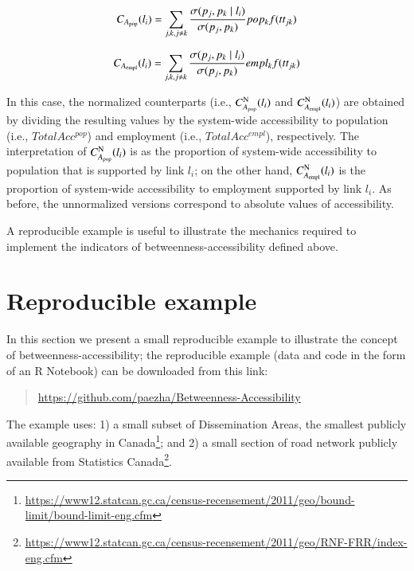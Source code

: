 \documentclass[]{elsarticle} %
\begin{document}
\begin{equation}\label{f:btw_acc_pop}
C_{A_{\rm pop}}(l_i)  =\sum_{j,k,j\neq k} \frac{{\sigma(p_j,p_k \mid l_i)}}{\sigma(p_j,p_k)} {{pop_k}{f(tt_{jk})}}%
\end{equation}

\begin{equation}\label{f:btw_empl_pop}
C_{A_{\rm empl}}(l_i)  =\sum_{j,k,j\neq k} \frac{{\sigma(p_j,p_k \mid l_i)}}{\sigma(p_j,p_k)} empl_kf(tt_{jk})%
\end{equation}

In this case, the normalized counterparts (i.e.,
\(C_{A_{\rm pop}}^{\rm N}(l_i)\) and \(C_{A_{\rm empl}}^{\rm N}(l_i)\))
are obtained by dividing the resulting values by the system-wide
accessibility to population (i.e., \(TotalAcc^{pop}\)) and employment
(i.e., \(TotalAcc^{empl}\)), respectively. The interpretation of
\(C_{A_{\rm pop}}^{\rm N}(l_i)\) is as the proportion of system-wide
accessibility to population that is supported by link \(l_i\); on the
other hand, \(C_{A_{\rm empl}}^{\rm N}(l_i)\) is the proportion of
system-wide accessibility to employment supported by link \(l_i\). As
before, the unnormalized versions correspond to absolute values of
accessibility.

A reproducible example is useful to illustrate the mechanics required to
implement the indicators of betweenness-accessibility defined above.

\section{Reproducible example}\label{reproducible-example}

In this section we present a small reproducible example to illustrate
the concept of betweenness-accessibility; the reproducible example (data
and code in the form of an R Notebook) can be downloaded from this link:

\begin{quote}
\url{https://github.com/paezha/Betweenness-Accessibility}
\end{quote}

The example uses: 1) a small subset of Dissemination Areas, the smallest
publicly available geography in Canada\footnote{\url{https://www12.statcan.gc.ca/census-recensement/2011/geo/bound-limit/bound-limit-eng.cfm}};
and 2) a small section of road network publicly available from
Statistics Canada\footnote{\url{https://www12.statcan.gc.ca/census-recensement/2011/geo/RNF-FRR/index-eng.cfm}}.
\end{document}
